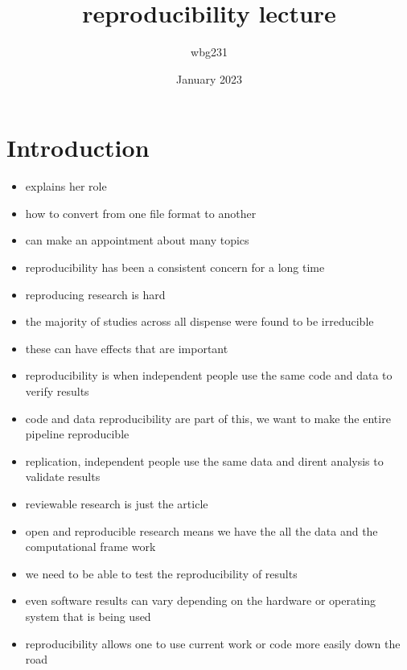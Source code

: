 \documentclass{article}
\title{reproducibility lecture }
\author{wbg231 }
\date{January 2023}
\begin{document}
\maketitle

\section{Introduction}
\begin{itemize}
\item explains her role 
\item how to convert from one file format to another 
\item can make an appointment about many topics
\item reproducibility has been a consistent concern for a long time 
\item reproducing research is hard 
\item the majority of studies across all dispense were found to be irreducible  
\item these can have effects that are important
\item reproducibility is when independent people use the same code and data to verify results
\item code and data reproducibility are part of this, we want to make the entire pipeline reproducible 
\item replication, independent people use the same data and dirent analysis to validate results
\item reviewable research is just the article 
\item open and reproducible research means we have the all the data and the computational frame work 
\item we need to be able to test the reproducibility of results
\item even software results can vary depending on the hardware or operating system that is being used
\item reproducibility allows one to use current work or code more easily down the road

\end{itemize}
\end{document}
